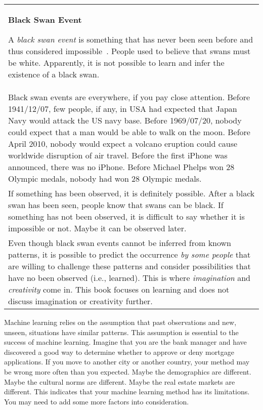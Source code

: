 \vspace{0.1in}\begin{tabular}{p{5in}}
\index{black swan event}
  \begin{center}
    {\bf Black Swan Event}
  \end{center}
  A {\it black swan event} is something that has never been seen
  before and thus considered
  impossible~\cite{Taleb2010BlackSwan}.  People
  used to believe that swans must be white. Apparently, it is not
  possible to learn and infer the existence of a black swan.

  \\
  
  Black
  swan events are everywhere, if you pay close attention.  Before
  1941/12/07, few people, if any, in USA had expected that Japan Navy
  would attack the US navy base. Before 1969/07/20, nobody could
  expect that a man would be able to walk on the moon. Before April
  2010, nobody would expect a volcano eruption could cause worldwide
  disruption of air travel.  Before the first iPhone was announced,
  there was no iPhone. Before Michael Phelps won 28 Olympic medals,
  nobody had won 28 Olympic medals.

  \\

  If something has been observed, it is definitely possible.  After a
  black swan has been seen, people know that swans can be black.  If
  something has not been observed, it is difficult to say whether it
  is impossible or not. Maybe it can be observed later.

  \\

  Even though black swan events cannot be inferred  from known patterns,
  it is possible to predict the occurrence {\it by some people} that
  are willing to challenge these patterns and consider
  possibilities that have no been observed (i.e., learned). This
  is where {\it imagination} and {\it creativity} come in.
  This book focuses on learning  and does not discuss imagination or
  creativity further.

  \index{imagination}
  \index{creativity}
    
  
\end{tabular}\vspace{0.1in}

Machine learning relies on the assumption that past observations and
new, unseen, situations have similar patterns.  This assumption is
essential to the success of machine learning.  Imagine that you are
the bank manager and have discovered a good way to determine whether
to approve or deny mortgage applications.  If you move to another city
or another country, your method may be wrong more often than you
expected. Maybe the demographics are different. Maybe the cultural
norms are different.  Maybe the real estate markets are different.
This indicates that your machine learning method has its limitations.
You may need to add some more factors into consideration.

